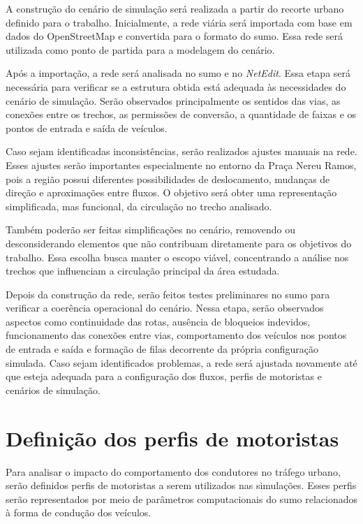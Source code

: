 A construção do cenário de simulação será realizada a partir do recorte urbano definido para o trabalho. Inicialmente, a rede viária será importada com base em dados do OpenStreetMap e convertida para o formato do \gls{sumo}. Essa rede será utilizada como ponto de partida para a modelagem do cenário.

Após a importação, a rede será analisada no \gls{sumo} e no \textit{NetEdit}. Essa etapa será necessária para verificar se a estrutura obtida está adequada às necessidades do cenário de simulação. Serão observados principalmente os sentidos das vias, as conexões entre os trechos, as permissões de conversão, a quantidade de faixas e os pontos de entrada e saída de veículos.

Caso sejam identificadas inconsistências, serão realizados ajustes manuais na rede. Esses ajustes serão importantes especialmente no entorno da Praça Nereu Ramos, pois a região possui diferentes possibilidades de deslocamento, mudanças de direção e aproximações entre fluxos. O objetivo será obter uma representação simplificada, mas funcional, da circulação no trecho analisado.

Também poderão ser feitas simplificações no cenário, removendo ou desconsiderando elementos que não contribuam diretamente para os objetivos do trabalho. Essa escolha busca manter o escopo viável, concentrando a análise nos trechos que influenciam a circulação principal da área estudada.

Depois da construção da rede, serão feitos testes preliminares no \gls{sumo} para verificar a coerência operacional do cenário. Nessa etapa, serão observados aspectos como continuidade das rotas, ausência de bloqueios indevidos, funcionamento das conexões entre vias, comportamento dos veículos nos pontos de entrada e saída e formação de filas decorrente da própria configuração simulada. Caso sejam identificados problemas, a rede será ajustada novamente até que esteja adequada para a configuração dos fluxos, perfis de motoristas e cenários de simulação.

\section{Definição dos perfis de motoristas}

Para analisar o impacto do comportamento dos condutores no tráfego urbano, serão definidos perfis de motoristas a serem utilizados nas simulações. Esses perfis serão representados por meio de parâmetros computacionais do \gls{sumo} relacionados à forma de condução dos veículos.

